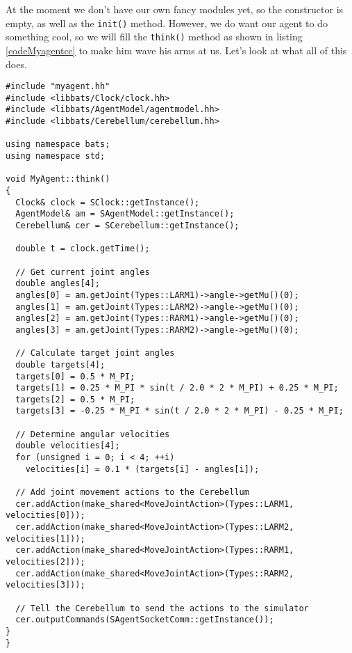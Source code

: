 At the moment we don't have our own fancy modules yet, so the constructor is empty, as well as the {\tt init()} method. However, we do want our agent to do something cool, so we will fill the {\tt think()} method as shown in listing \ref{codeMyagentcc} to make him wave his arms at us. Let's look at what all of this does.

\begin{lstlisting}[float,caption={\tt myagent.cc},label=codeMyagentcc,frame=single]
#include "myagent.hh"
#include <libbats/Clock/clock.hh>
#include <libbats/AgentModel/agentmodel.hh>
#include <libbats/Cerebellum/cerebellum.hh>

using namespace bats;
using namespace std;

void MyAgent::think()
{
  Clock& clock = SClock::getInstance();
  AgentModel& am = SAgentModel::getInstance();
  Cerebellum& cer = SCerebellum::getInstance();
  
  double t = clock.getTime();
  
  // Get current joint angles
  double angles[4];
  angles[0] = am.getJoint(Types::LARM1)->angle->getMu()(0);
  angles[1] = am.getJoint(Types::LARM2)->angle->getMu()(0);
  angles[2] = am.getJoint(Types::RARM1)->angle->getMu()(0);
  angles[3] = am.getJoint(Types::RARM2)->angle->getMu()(0);
  
  // Calculate target joint angles
  double targets[4];
  targets[0] = 0.5 * M_PI;
  targets[1] = 0.25 * M_PI * sin(t / 2.0 * 2 * M_PI) + 0.25 * M_PI;
  targets[2] = 0.5 * M_PI;
  targets[3] = -0.25 * M_PI * sin(t / 2.0 * 2 * M_PI) - 0.25 * M_PI;
  
  // Determine angular velocities
  double velocities[4];
  for (unsigned i = 0; i < 4; ++i)
    velocities[i] = 0.1 * (targets[i] - angles[i]);
  
  // Add joint movement actions to the Cerebellum
  cer.addAction(make_shared<MoveJointAction>(Types::LARM1, velocities[0]));
  cer.addAction(make_shared<MoveJointAction>(Types::LARM2, velocities[1]));
  cer.addAction(make_shared<MoveJointAction>(Types::RARM1, velocities[2]));
  cer.addAction(make_shared<MoveJointAction>(Types::RARM2, velocities[3]));
  
  // Tell the Cerebellum to send the actions to the simulator
  cer.outputCommands(SAgentSocketComm::getInstance());
}
}
\end{lstlisting}

